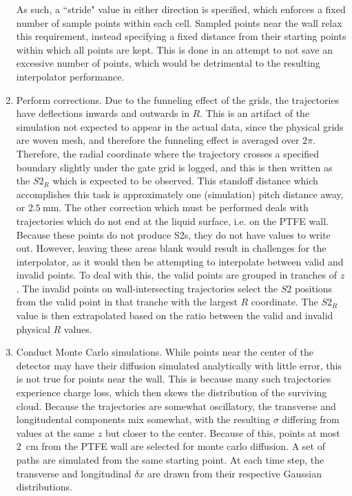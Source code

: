 \begin{enumerate}
    As such, a ``stride" value in either direction is specified, which enforces a fixed number of sample points within each cell.
    Sampled points near the wall relax this requirement, instead specifying a fixed distance from their starting points within which all points are kept. 
    This is done in an attempt to not save an excessive number of points, which would be detrimental to the resulting interpolator performance. 
    \item Perform corrections. Due to the funneling effect of the grids, the trajectories have deflections inwards and outwards in $R$.
    This is an artifact of the simulation not expected to appear in the actual data, since the physical grids are woven mesh, and therefore the funneling effect is averaged over $2 \pi$. 
    Therefore, the radial coordinate where the trajectory crosses a specified boundary slightly under the gate grid is logged, and this is then written as the $S2_R$ which is expected to be observed.
    This standoff distance which accomplishes this task is approximately one (simulation) pitch distance away, or $2.5 \mathrm{~mm}$.
    The other correction which must be performed deals with trajectories which do not end at the liquid surface, i.e. on the PTFE wall.
    Because these points do not produce S2s, they do not have values to write out. However, leaving these areas blank would result in challenges for the interpolator, as it would then be attempting to interpolate between valid and invalid points.
    To deal with this, the valid points are grouped in tranches of $z$. 
    The invalid points on wall-intersecting trajectories select the $S2$ positions from the valid point in that tranche with the largest $R$ coordinate. 
    The $S2_R$ value is then extrapolated based on the ratio between the valid and invalid physical $R$ values.
    \item Conduct Monte Carlo simulations. While points near the center of the detector may have their diffusion simulated analytically with little error, this is not true for points near the wall.
    This is because many such trajectories experience charge loss, which then skews the distribution of the surviving cloud.
    Because the trajectories are somewhat oscillatory, the transverse and longitudental components mix somewhat, with the resulting $\sigma$ differing from values at the same $z$ but closer to the center.
    Because of this, points at most 2~cm from the PTFE wall are selected for monte carlo diffusion.
    A set of paths are simulated from the same starting point. 
    At each time step, the transverse and longitudinal $\delta x$ are drawn from their respective Gaussian distributions.

\end{enumerate}
